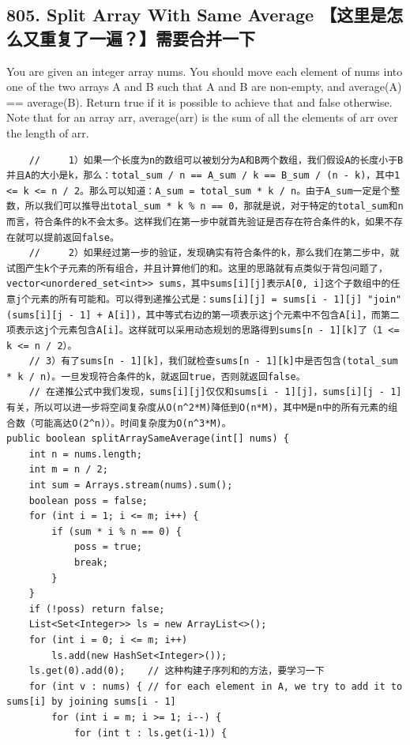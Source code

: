 \documentclass[9pt, b5paaper]{book}
\begin{document}
\subsection{805. Split Array With Same Average 【这里是怎么又重复了一遍？】需要合并一下}
\label{sec-1-4-2}
You are given an integer array nums.
You should move each element of nums into one of the two arrays A and B such that A and B are non-empty, and average(A) == average(B).
Return true if it is possible to achieve that and false otherwise.
Note that for an array arr, average(arr) is the sum of all the elements of arr over the length of arr.
\begin{verbatim}
    //     1）如果一个长度为n的数组可以被划分为A和B两个数组，我们假设A的长度小于B并且A的大小是k，那么：total_sum / n == A_sum / k == B_sum / (n - k)，其中1 <= k <= n / 2。那么可以知道：A_sum = total_sum * k / n。由于A_sum一定是个整数，所以我们可以推导出total_sum * k % n == 0，那就是说，对于特定的total_sum和n而言，符合条件的k不会太多。这样我们在第一步中就首先验证是否存在符合条件的k，如果不存在就可以提前返回false。
    //     2）如果经过第一步的验证，发现确实有符合条件的k，那么我们在第二步中，就试图产生k个子元素的所有组合，并且计算他们的和。这里的思路就有点类似于背包问题了，vector<unordered_set<int>> sums，其中sums[i][j]表示A[0, i]这个子数组中的任意j个元素的所有可能和。可以得到递推公式是：sums[i][j] = sums[i - 1][j] "join" (sums[i][j - 1] + A[i])，其中等式右边的第一项表示这j个元素中不包含A[i]，而第二项表示这j个元素包含A[i]。这样就可以采用动态规划的思路得到sums[n - 1][k]了（1 <= k <= n / 2）。
    // 3）有了sums[n - 1][k]，我们就检查sums[n - 1][k]中是否包含(total_sum * k / n)。一旦发现符合条件的k，就返回true，否则就返回false。
    // 在递推公式中我们发现，sums[i][j]仅仅和sums[i - 1][j]，sums[i][j - 1]有关，所以可以进一步将空间复杂度从O(n^2*M)降低到O(n*M)，其中M是n中的所有元素的组合数（可能高达O(2^n)）。时间复杂度为O(n^3*M)。
public boolean splitArraySameAverage(int[] nums) {
    int n = nums.length;
    int m = n / 2;
    int sum = Arrays.stream(nums).sum();
    boolean poss = false;
    for (int i = 1; i <= m; i++) {
        if (sum * i % n == 0) {
            poss = true;
            break;
        }
    }
    if (!poss) return false;
    List<Set<Integer>> ls = new ArrayList<>();
    for (int i = 0; i <= m; i++) 
        ls.add(new HashSet<Integer>());
    ls.get(0).add(0);    // 这种构建子序列和的方法，要学习一下
    for (int v : nums) { // for each element in A, we try to add it to sums[i] by joining sums[i - 1]
        for (int i = m; i >= 1; i--) {
            for (int t : ls.get(i-1)) {

\end{verbatim}
\end{document}

